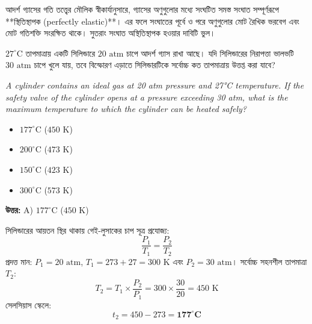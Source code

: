 \documentclass[12pt, a4paper]{article}
\begin{document}
\begin{tcolorbox}[solutionbox={সমাধান (Solution)}]
    \noindent
    আদর্শ গ্যাসের গতি তত্ত্বের মৌলিক স্বীকার্যানুসারে, গ্যাসের অণুগুলোর মধ্যে সংঘটিত সমস্ত সংঘাত সম্পূর্ণরূপে **স্থিতিস্থাপক (perfectly elastic)**। এর ফলে সংঘাতের পূর্বে ও পরে অণুগুলোর মোট রৈখিক ভরবেগ এবং মোট গতিশক্তি সংরক্ষিত থাকে। সুতরাং সংঘাত অস্থিতিস্থাপক হওয়ার দাবিটি ভুল।
\end{tcolorbox}

\vspace{2em}

\begin{tcolorbox}[questionbox={প্রশ্ন (Question) 17}]
    \noindent
    $27^\circ\text{C}$ তাপমাত্রায় একটি সিলিন্ডারে $20\text{ atm}$ চাপে আদর্শ গ্যাস রাখা আছে। যদি সিলিন্ডারের নিরাপত্তা ভালভটি $30\text{ atm}$ চাপে খুলে যায়, তবে বিস্ফোরণ এড়াতে সিলিন্ডারটিকে সর্বোচ্চ কত তাপমাত্রায় উত্তপ্ত করা যাবে?
    
    \vspace{0.8em}
    \begin{english}
    \noindent\textit{\color{darkgray}
    A cylinder contains an ideal gas at 20 atm pressure and 27°C temperature. If the safety valve of the cylinder opens at a pressure exceeding 30 atm, what is the maximum temperature to which the cylinder can be heated safely?
    }
    \end{english}
\end{tcolorbox}

\begin{itemize}[label={}, leftmargin=1cm, itemsep=0.5em]
    \item[\textbf{A)}] $177^\circ\text{C}$ ($450\text{ K}$)
    \item[\textbf{B)}] $200^\circ\text{C}$ ($473\text{ K}$)
    \item[\textbf{C)}] $150^\circ\text{C}$ ($423\text{ K}$)
    \item[\textbf{D)}] $300^\circ\text{C}$ ($573\text{ K}$)
\end{itemize}

\vspace{0.5em}
\begin{tcolorbox}[answerbox]
    \textbf{\color{success} উত্তর:} A) $177^\circ\text{C}$ ($450\text{ K}$)
\end{tcolorbox}
\vspace{1em}

\begin{tcolorbox}[solutionbox={সমাধান (Solution)}]
    \noindent
    সিলিন্ডারের আয়তন স্থির থাকায় গেই-লুসাকের চাপ সূত্র প্রযোজ্য:
    \[ \frac{P_1}{T_1} = \frac{P_2}{T_2} \]
    প্রদত্ত মান: $P_1 = 20\text{ atm}$, $T_1 = 273 + 27 = 300\text{ K}$ এবং $P_2 = 30\text{ atm}$। সর্বোচ্চ সহনশীল তাপমাত্রা $T_2$:
    \[ T_2 = T_1 \times \frac{P_2}{P_1} = 300 \times \frac{30}{20} = 450\text{ K} \]
    সেলসিয়াস স্কেলে:
    \[ t_2 = 450 - 273 = \mathbf{177^\circ\text{C}} \]
\end{tcolorbox}
\end{document}
